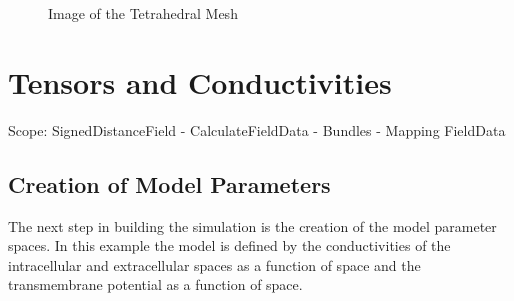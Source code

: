 \documentclass[fleqn,11pt,openany]{book}
\begin{document}
\begin{figure}
\caption{Image of the Tetrahedral Mesh}\label{fig:ResultingMesh}
\end{figure}


\chapter{Tensors and Conductivities}

\begin{introduction}
Scope: SignedDistanceField - CalculateFieldData - Bundles - Mapping FieldData
\end{introduction}

\section{Creation of Model Parameters}

The next step in building the simulation is the creation of the model parameter spaces. In this example the model is defined by the conductivities of the intracellular and extracellular spaces as a function of space and the transmembrane potential as a function of space. 
\end{document}
